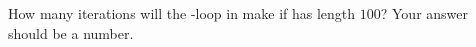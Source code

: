 \begin{prob}[(3 points)]
\begin{subprobset}
\begin{subprob}
        \end{subprob}

        \begin{subprob}
            How many iterations will the -loop in
             make if  has length
            $100$? Your answer should be a number.

        \end{subprob}

    \end{subprobset}

\end{prob}
